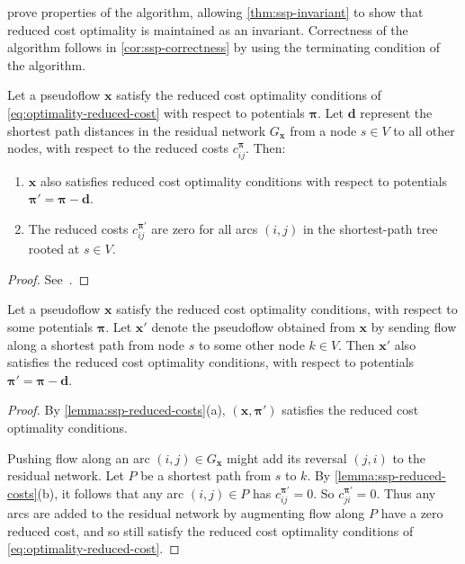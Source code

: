  prove properties of the algorithm, allowing \cref{thm:ssp-invariant} to show that reduced cost optimality is maintained as an invariant. Correctness of the algorithm follows in \cref{cor:ssp-correctness} by using the terminating condition of the algorithm.\\

\begin{lemma} \label{lemma:ssp-reduced-costs}
Let a pseudoflow $\mathbf{x}$ satisfy the reduced cost optimality conditions of \cref{eq:optimality-reduced-cost} with respect to potentials $\boldsymbol{\pi}$. Let $\mathbf{d}$ represent the shortest path distances in the residual network $G_{\mathbf{x}}$ from a node $s \in V$ to all other nodes, with respect to the reduced costs $c^{\boldsymbol{\pi}}_{ij}$. Then:
    
\begin{enumerate}[label=(\alph*)]
  \item $\mathbf{x}$ also satisfies reduced cost optimality conditions with respect to potentials $\boldsymbol{\pi}' = \boldsymbol{\pi} - \mathbf{d}$.
  \item The reduced costs $c^{\boldsymbol{\pi}'}_{ij}$ are zero for all arcs $(i,j)$ in the shortest-path tree rooted at $s \in V$.
\end{enumerate}
\end{lemma}
\begin{proof}
See~\cite[p.~320]{Ahuja:1993}.
\end{proof}

\begin{cor} \label{cor:ssp-reduced-costs}
Let a pseudoflow $\mathbf{x}$ satisfy the reduced cost optimality conditions, with respect to some potentials $\boldsymbol{\pi}$. Let $\mathbf{x}'$ denote the pseudoflow obtained from $\mathbf{x}$ by sending flow along a shortest path from node $s$ to some other node $k \in V$. Then $\mathbf{x}'$ also satisfies the reduced cost optimality conditions, with respect to potentials $\boldsymbol{\pi}' = \boldsymbol{\pi} - \mathbf{d}$.
\end{cor}
\begin{proof}
By \cref{lemma:ssp-reduced-costs}(a), $\left(\mathbf{x},\boldsymbol{\pi'}\right)$ satisfies the reduced cost optimality conditions.

Pushing flow along an arc $(i,j) \in G_{\mathbf{x}}$ might add its reversal $(j,i)$ to the residual network. Let $P$ be a shortest path from $s$ to $k$. By \cref{lemma:ssp-reduced-costs}(b), it follows that any arc $(i,j) \in P$ has $c^{\boldsymbol{\pi}'}_{ij} = 0$. So $c^{\boldsymbol{\pi}'}_{ji} = 0$. Thus any arcs are added to the residual network by augmenting flow along $P$ have a zero reduced cost, and so still satisfy the reduced cost optimality conditions of \cref{eq:optimality-reduced-cost}.
\end{proof}

